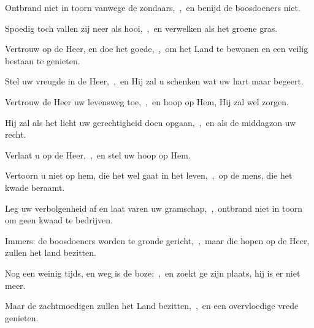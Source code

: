 \documentclass[12pt,twoside,a5paper]{article}
\begin{document}
\begin{halfparskip}
  Ontbrand niet in toorn vanwege de zondaars,~\sep\ en benijd de boosdoeners niet.


  Spoedig toch vallen zij neer als hooi,~\sep\ en verwelken als het groene gras.

  Vertrouw op de Heer, en doe het goede,~\sep\ om het Land te bewonen en een veilig bestaan te genieten.

  Stel uw vreugde in de Heer,~\sep\ en Hij zal u schenken wat uw hart maar begeert.

  Vertrouw de Heer uw levensweg toe,~\sep\ en hoop op Hem, Hij zal wel zorgen.

  Hij zal als het licht uw gerechtigheid doen opgaan,~\sep\ en als de middagzon uw recht.

  Verlaat u op de Heer,~\sep\ en stel uw hoop op Hem.

  Vertoorn u niet op hem, die het wel gaat in het leven,~\sep\ op de mens, die het kwade beraamt.

  Leg uw verbolgenheid af en laat varen uw gramschap,~\sep\ ontbrand niet in toorn om geen kwaad te bedrijven.

  Immers: de boosdoeners worden te gronde gericht,~\sep\ maar die hopen op de Heer, zullen het land bezitten.

  Nog een weinig tijds, en weg is de boze;~\sep\ en zoekt ge zijn plaats, hij is er niet meer.

  Maar de zachtmoedigen zullen het Land bezitten,~\sep\ en een overvloedige vrede genieten.
\end{halfparskip}

\end{document}
